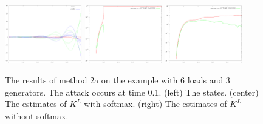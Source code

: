 \documentclass{article}
\begin{document}
\begin{figure}
\includegraphics[width=0.3\textwidth]{example1-states}
\includegraphics[width=0.3\textwidth]{example1-K_L}
\includegraphics[width=0.3\textwidth]{example1-K_L-raw}
\caption{
    The results of method 2a on the example with 6 loads and 3 generators.
    The attack occurs at time 0.1.
    (left) The states.
    (center) The estimates of $K^L$ with softmax.
    (right) The estimates of $K^L$ without softmax.
}
\end{figure}
\end{document}
